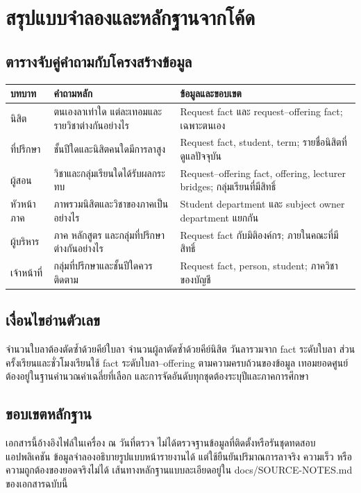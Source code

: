 \appendix
{}
\section{สรุปแบบจำลองและหลักฐานจากโค้ด}


\subsection{ตารางจับคู่คำถามกับโครงสร้างข้อมูล}
\renewcommand{\arraystretch}{1.3}
\noindent
\begin{minipage}{\linewidth}
  \begin{tabularx}{\textwidth}{p{25mm}XX}\toprule\rowcolor{tableheader}
    \textbf{บทบาท} & \textbf{คำถามหลัก} & \textbf{ข้อมูลและขอบเขต}\\\midrule
    นิสิต & ตนเองลาเท่าใด แต่ละเทอมและรายวิชาต่างกันอย่างไร & Request fact และ request--offering fact; เฉพาะตนเอง\\\midrule
    ที่ปรึกษา & ชั้นปีใดและนิสิตคนใดมีการลาสูง & Request fact, student, term; รายชื่อนิสิตที่ดูแลปัจจุบัน\\\midrule
    ผู้สอน & วิชาและกลุ่มเรียนใดได้รับผลกระทบ & Request--offering fact, offering, lecturer bridges; กลุ่มเรียนที่มีสิทธิ์\\\midrule
    หัวหน้าภาค & ภาพรวมนิสิตและวิชาของภาคเป็นอย่างไร & Student department และ subject owner department แยกกัน\\\midrule
    ผู้บริหาร & ภาค หลักสูตร และกลุ่มที่ปรึกษาต่างกันอย่างไร & Request fact กับมิติองค์กร; ภายในคณะที่มีสิทธิ์\\\midrule
    เจ้าหน้าที่ & กลุ่มที่ปรึกษาและชั้นปีใดควรติดตาม & Request fact, person, student; ภาควิชาของบัญชี\\\bottomrule
  \end{tabularx}
\end{minipage}

\subsection{เงื่อนไขอ่านตัวเลข}
จำนวนใบลาต้องตัดซ้ำด้วยคีย์ใบลา จำนวนผู้ลาตัดซ้ำด้วยคีย์นิสิต วันลารวมจาก fact ระดับใบลา ส่วนครั้งเรียนและชั่วโมงเรียนใช้ fact ระดับใบลา--offering ตามความครบถ้วนของข้อมูล เทอมยอดศูนย์ต้องอยู่ในฐานคำนวณค่าเฉลี่ยที่เลือก และการจัดอันดับทุกชุดต้องระบุปีและภาคการศึกษา

\subsection{ขอบเขตหลักฐาน}
เอกสารนี้อ้างอิงไฟล์ในเครื่อง ณ วันที่ตรวจ ไม่ได้ตรวจฐานข้อมูลที่ติดตั้งหรือรันชุดทดสอบแอปพลิเคชัน ข้อมูลจำลองอธิบายรูปแบบหน้ารายงานได้ แต่ใช้ยืนยันปริมาณการลาจริง ความเร็ว หรือความถูกต้องของยอดจริงไม่ได้ เส้นทางหลักฐานแบบละเอียดอยู่ใน docs/SOURCE-NOTES.md ของเอกสารฉบับนี้
